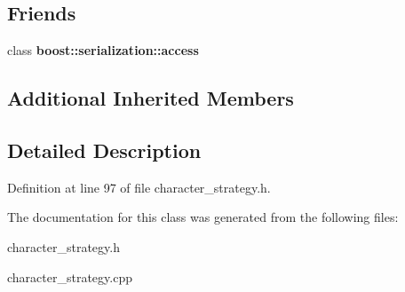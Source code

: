 \subsection*{Friends}
\begin{DoxyCompactItemize}
\item 
\hypertarget{class_friendly_strategy_ac98d07dd8f7b70e16ccb9a01abf56b9c}{}\label{class_friendly_strategy_ac98d07dd8f7b70e16ccb9a01abf56b9c} 
class {\bfseries boost\+::serialization\+::access}
\end{DoxyCompactItemize}
\subsection*{Additional Inherited Members}


\subsection{Detailed Description}


Definition at line 97 of file character\+\_\+strategy.\+h.



The documentation for this class was generated from the following files\+:\begin{DoxyCompactItemize}
\item 
character\+\_\+strategy.\+h\item 
character\+\_\+strategy.\+cpp\end{DoxyCompactItemize}
